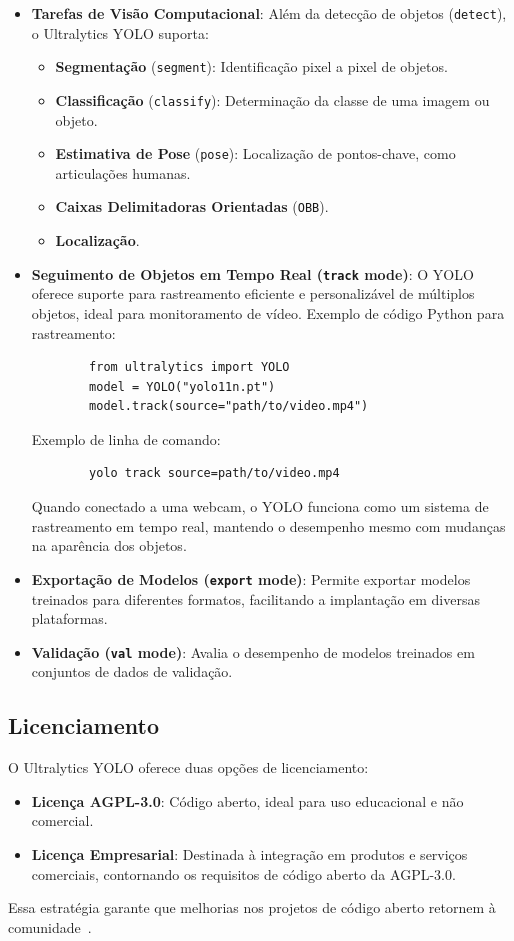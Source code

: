 \documentclass[journal,transmag]{IEEEtran}
\begin{document}
\begin{itemize}
	\item \textbf{Tarefas de Visão Computacional}: Além da detecção de objetos (\texttt{detect}), o Ultralytics YOLO suporta:
	\begin{itemize}
		\item \textbf{Segmentação} (\texttt{segment}): Identificação pixel a pixel de objetos.
		\item \textbf{Classificação} (\texttt{classify}): Determinação da classe de uma imagem ou objeto.
		\item \textbf{Estimativa de Pose} (\texttt{pose}): Localização de pontos-chave, como articulações humanas.
		\item \textbf{Caixas Delimitadoras Orientadas} (\texttt{OBB}).
		\item \textbf{Localização}.
	\end{itemize}
	
	\item \textbf{Seguimento de Objetos em Tempo Real (\texttt{track} mode)}: O YOLO oferece suporte para rastreamento eficiente e personalizável de múltiplos objetos, ideal para monitoramento de vídeo. Exemplo de código Python para rastreamento:
	\begin{verbatim}
		from ultralytics import YOLO
		model = YOLO("yolo11n.pt")
		model.track(source="path/to/video.mp4")
	\end{verbatim}
	Exemplo de linha de comando:
	\begin{verbatim}
		yolo track source=path/to/video.mp4
	\end{verbatim}
	Quando conectado a uma webcam, o YOLO funciona como um sistema de rastreamento em tempo real, mantendo o desempenho mesmo com mudanças na aparência dos objetos.
	
	\item \textbf{Exportação de Modelos (\texttt{export} mode)}: Permite exportar modelos treinados para diferentes formatos, facilitando a implantação em diversas plataformas.
	
	\item \textbf{Validação (\texttt{val} mode)}: Avalia o desempenho de modelos treinados em conjuntos de dados de validação.
\end{itemize}

\subsection{Licenciamento}

O Ultralytics YOLO oferece duas opções de licenciamento:
\begin{itemize}
	\item \textbf{Licença AGPL-3.0}: Código aberto, ideal para uso educacional e não comercial.
	\item \textbf{Licença Empresarial}: Destinada à integração em produtos e serviços comerciais, contornando os requisitos de código aberto da AGPL-3.0.
\end{itemize}
Essa estratégia garante que melhorias nos projetos de código aberto retornem à comunidade~\cite{Redmon2015}.
\end{document}

